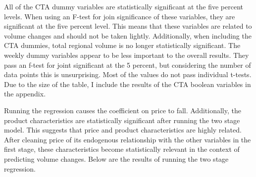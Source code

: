 \documentclass{article}
\begin{document}
All of the CTA dummy variables are statistically significant at the five percent levels. When using an F-test for join significance of these variables, they are significant at the five percent level. This means that these variables are related to volume changes and should not be taken lightly. Additionally, when including the CTA dummies, total regional volume is no longer statistically significant. The weekly dummy variables appear to be less important to the overall results. They pass an f-test for joint significant at the 5 percent, but considering the number of data points this is unsurprising. Most of the values do not pass individual t-tests. Due to the size of the table, I include the results of the CTA boolean variables in the appendix.


Running the regression causes the coefficient on price to fall. Additionally, the product characteristics are statistically significant after running the two stage model. This suggests that price and product characteristics are highly related. After cleaning price of its endogenous relationship with the other variables in the first stage, these characteristics become statistically relevant in the context of predicting volume changes. Below are the results of running the two stage regression.
\end{document}
